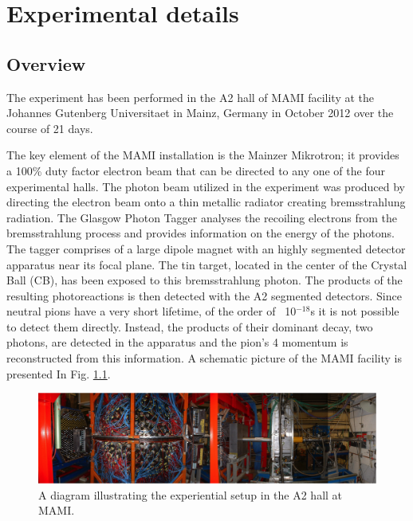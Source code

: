 \setcounter{equation}{0}

\chapter{Experimental details}
%
\section{Overview}

\indent The experiment has been performed in the A2 hall of MAMI facility at the Johannes Gutenberg Universitaet in Mainz, Germany in October 2012 over the course of 21 days.

\indent The key element of the MAMI installation is the Mainzer Mikrotron; it provides a 100\% duty factor electron beam that can be directed to any one of the four experimental halls. The photon beam utilized in the experiment was produced by directing the electron beam onto a thin metallic radiator creating bremsstrahlung radiation. The Glasgow Photon Tagger analyses the recoiling electrons from the bremsstrahlung process and provides information on the energy of the photons. The tagger comprises of a large dipole magnet with an highly segmented detector apparatus near its focal plane. The tin target, located in the center of the Crystal Ball (CB), has been exposed to this bremsstrahlung photon. The products of the resulting photoreactions is then detected with the A2 segmented detectors. Since neutral pions have a very short lifetime, of the order of ~10$^{-18}$s it is not possible to detect them directly. Instead, the products of their dominant decay, two photons, are detected in the apparatus and the pion's 4 momentum is reconstructed from this information. A schematic picture of the MAMI facility is presented In Fig. \ref{a2hallsetup}.

\begin{figure}[H]
\begin{center}
\includegraphics[scale=0.55]{pictures/png/a2hallsetup.png}
\caption{A diagram illustrating the experiential setup in the A2 hall at MAMI.}
\label{a2hallsetup}
\end{center}
\end{figure}

